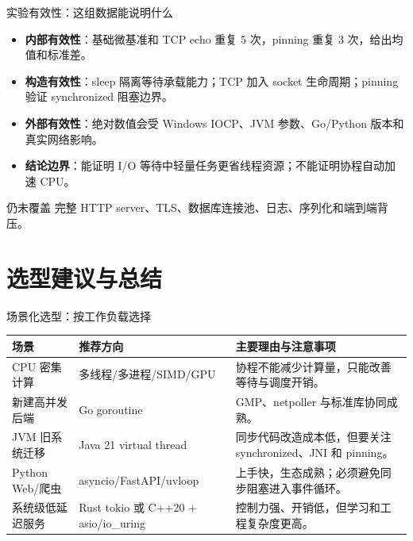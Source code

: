 \documentclass[UTF8,aspectratio=169,11pt]{ctexbeamer}
\begin{document}
\begin{frame}{实验有效性：这组数据能说明什么}
  \small
  \begin{itemize}
    \item \textbf{内部有效性}：基础微基准和 TCP echo 重复 5 次，pinning 重复 3 次，给出均值和标准差。
    \item \textbf{构造有效性}：sleep 隔离等待承载能力；TCP 加入 socket 生命周期；pinning 验证 synchronized 阻塞边界。
    \item \textbf{外部有效性}：绝对数值会受 Windows IOCP、JVM 参数、Go/Python 版本和真实网络影响。
    \item \textbf{结论边界}：能证明 I/O 等待中轻量任务更省线程资源；不能证明协程自动加速 CPU。
  \end{itemize}
  \begin{alertblock}{仍未覆盖}
    完整 HTTP server、TLS、数据库连接池、日志、序列化和端到端背压。
  \end{alertblock}
\end{frame}

\section{选型建议与总结}

\begin{frame}{场景化选型：按工作负载选择}
  \scriptsize
  \begin{tabularx}{\linewidth}{l Y Y}
    \toprule
    场景 & 推荐方向 & 主要理由与注意事项 \\
    \midrule
    CPU 密集计算 & 多线程/多进程/SIMD/GPU & 协程不能减少计算量，只能改善等待与调度开销。 \\
    新建高并发后端 & Go goroutine & GMP、netpoller 与标准库协同成熟。 \\
    JVM 旧系统迁移 & Java 21 virtual thread & 同步代码改造成本低，但要关注 synchronized、JNI 和 pinning。 \\
    Python Web/爬虫 & asyncio/FastAPI/uvloop & 上手快，生态成熟；必须避免同步阻塞进入事件循环。 \\
    系统级低延迟服务 & Rust tokio 或 C++20 + asio/io\_uring & 控制力强、开销低，但学习和工程复杂度更高。 \\
    \bottomrule
  \end{tabularx}
\end{frame}
\end{document}
